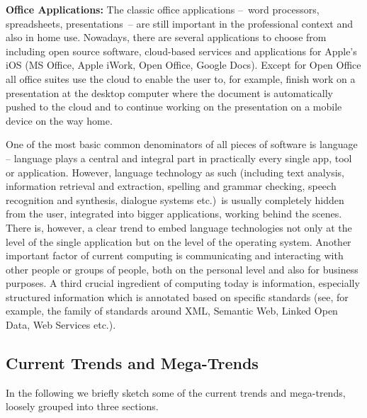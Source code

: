 \documentclass[10pt, plain]{../../metanetpaper}
\begin{document}
\begin{multicols}{2}
\textbf{Office Applications:} The classic office applications --~word processors, spreadsheets, presentations~-- are still important in the professional context and also in home use. Nowadays, there are several applications to choose from including open source software, cloud-based services and applications for Apple's iOS (MS Office, Apple iWork, Open Office, Google Docs). Except for Open Office all office suites use the cloud to enable the user to, for example, finish work on a presentation at the desktop computer where the document is automatically pushed to the cloud and to continue working on the presentation on a mobile device on the way home.

One of the most basic common denominators of all pieces of software is language -- language plays a central and integral part in practically every single app, tool or application. However, language technology as such (including text analysis, information retrieval and extraction, spelling and grammar checking, speech recognition and synthesis, dialogue systems etc.)~is usually completely hidden from the user, integrated into bigger applications, working behind the scenes. There is, however, a clear trend to embed language technologies not only at the level of the single application but on the level of the operating system. Another important factor of current computing is communicating and interacting with other people or groups of people, both on the personal level and also for business purposes.  A third crucial ingredient of computing today is information, especially structured information which is annotated based on specific standards (see, for example, the family of standards around XML, Semantic Web, Linked Open Data, Web Services etc.).

\subsection{Current Trends and Mega-Trends}
\label{sec:major-trends}


In the following we briefly sketch some of the current trends and mega-trends, loosely grouped into three sections.


\end{multicols}
\end{document}
